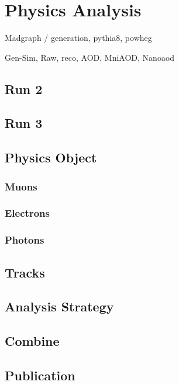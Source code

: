 \documentclass[reprint, a4paper, nofootinbib, amsmath, amssymb, aps]{revtex4-1}
\begin{document}
\section{Physics Analysis}
Madgraph / generation, pythia8, powheg

Gen-Sim, Raw, reco, AOD, MniAOD, Nanoaod
\subsection{Run 2}
\subsection{Run 3}
\subsection{Physics Object}
\subsubsection{Muons}
    \subsubsection{Electrons}
    \subsubsection{Photons}
\subsection{Tracks}

\subsection{Analysis Strategy}

\subsection{Combine}

\subsection{Publication}

\end{document}
